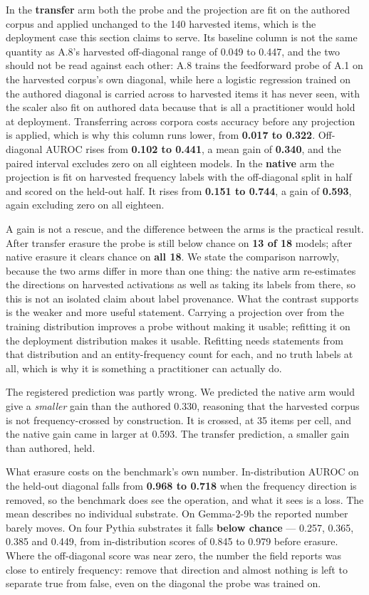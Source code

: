 \documentclass[10pt]{article}
\begin{document}
In the \textbf{transfer} arm both the probe and the projection are fit on the authored corpus and applied unchanged to the 140 harvested items, which is the deployment case this section claims to serve. Its baseline column is not the same quantity as A.8's harvested off-diagonal range of 0.049 to 0.447, and the two should not be read against each other: A.8 trains the feedforward probe of A.1 on the harvested corpus's own diagonal, while here a logistic regression trained on the authored diagonal is carried across to harvested items it has never seen, with the scaler also fit on authored data because that is all a practitioner would hold at deployment. Transferring across corpora costs accuracy before any projection is applied, which is why this column runs lower, from \textbf{0.017 to 0.322}. Off-diagonal AUROC rises from \textbf{0.102 to 0.441}, a mean gain of \textbf{0.340}, and the paired interval excludes zero on all eighteen models. In the \textbf{native} arm the projection is fit on harvested frequency labels with the off-diagonal split in half and scored on the held-out half. It rises from \textbf{0.151 to 0.744}, a gain of \textbf{0.593}, again excluding zero on all eighteen.

A gain is not a rescue, and the difference between the arms is the practical result. After transfer erasure the probe is still below chance on \textbf{13 of 18} models; after native erasure it clears chance on \textbf{all 18}. We state the comparison narrowly, because the two arms differ in more than one thing: the native arm re-estimates the directions on harvested activations as well as taking its labels from there, so this is not an isolated claim about label provenance. What the contrast supports is the weaker and more useful statement. Carrying a projection over from the training distribution improves a probe without making it usable; refitting it on the deployment distribution makes it usable. Refitting needs statements from that distribution and an entity-frequency count for each, and no truth labels at all, which is why it is something a practitioner can actually do.

The registered prediction was partly wrong. We predicted the native arm would give a \emph{smaller} gain than the authored 0.330, reasoning that the harvested corpus is not frequency-crossed by construction. It is crossed, at 35 items per cell, and the native gain came in larger at 0.593. The transfer prediction, a smaller gain than authored, held.

What erasure costs on the benchmark's own number. In-distribution AUROC on the held-out diagonal falls from \textbf{0.968 to 0.718} when the frequency direction is removed, so the benchmark does see the operation, and what it sees is a loss. The mean describes no individual substrate. On Gemma-2-9b the reported number barely moves. On four Pythia substrates it falls \textbf{below chance} --- 0.257, 0.365, 0.385 and 0.449, from in-distribution scores of 0.845 to 0.979 before erasure. Where the off-diagonal score was near zero, the number the field reports was close to entirely frequency: remove that direction and almost nothing is left to separate true from false, even on the diagonal the probe was trained on.
\end{document}
